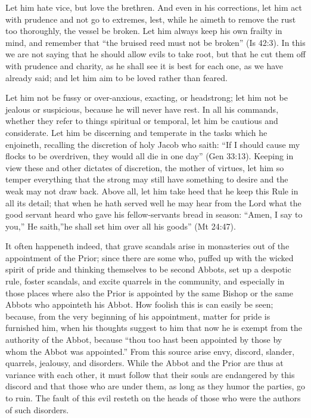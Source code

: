 Let him hate vice, but love the brethren. And even in his corrections, let him act with prudence and not go to extremes, lest, while he aimeth to remove the rust too thoroughly, the vessel be broken. Let him always keep his own frailty in mind, and remember that ``the bruised reed must not be broken'' (Is 42:3). In this we are not saying that he should allow evils to take root, but that he cut them off with prudence and charity, as he shall see it is best for each one, as we have already said; and let him aim to be loved rather than feared.

Let him not be fussy or over-anxious, exacting, or headstrong; let him not be jealous or suspicious, because he will never have rest. In all his commands, whether they refer to things spiritual or temporal, let him be cautious and considerate. Let him be discerning and temperate in the tasks which he enjoineth, recalling the discretion of holy Jacob who saith: ``If I should cause my flocks to be overdriven, they would all die in one day'' (Gen 33:13). Keeping in view these and other dictates of discretion, the mother of virtues, let him so temper everything that the strong may still have something to desire and the weak may not draw back. Above all, let him take heed that he keep this Rule in all its detail; that when he hath served well he may hear from the Lord what the good servant heard who gave his fellow-servants bread in season: ``Amen, I say to you,'' He saith,''he shall set him over all his goods'' (Mt 24:47).


It often happeneth indeed, that grave scandals arise in monasteries out of the appointment of the Prior; since there are some who, puffed up with the wicked spirit of pride and thinking themselves to be second Abbots, set up a despotic rule, foster scandals, and excite quarrels in the community, and especially in those places where also the Prior is appointed by the same Bishop or the same Abbots who appointeth his Abbot. How foolish this is can easily be seen; because, from the very beginning of his appointment, matter for pride is furnished him, when his thoughts suggest to him that now he is exempt from the authority of the Abbot, because ``thou too hast been appointed by those by whom the Abbot was appointed.'' From this source arise envy, discord, slander, quarrels, jealousy, and disorders. While the Abbot and the Prior are thus at variance with each other, it must follow that their souls are endangered by this discord and that those who are under them, as long as they humor the parties, go to ruin. The fault of this evil resteth on the heads of those who were the authors of such disorders.

